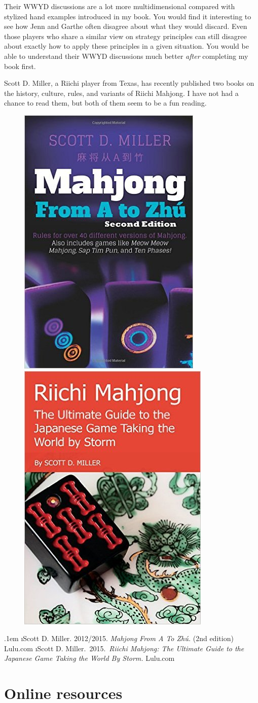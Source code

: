 \bigskip
Their WWYD discussions are a lot more multidimensional compared with stylized hand examples introduced in my book. You would find it interesting to see how Jenn and Garthe often disagree about what they would discard. Even those players who share a similar view on strategy principles can still disagree about exactly how to apply these principles in a given situation. 
You would be able to understand their WWYD discussions much better \emph{after} completing my book first. 

\bigskip
Scott D. Miller, a Riichi player from Texas, has recently published two books on the history, culture, rules, and variants of Riichi Mahjong. I have not had a chance to read them, but both of them seem to be a fun reading. 

\vspace{-2pt}
\begin{figure}[h]\centering
\includegraphics[height=.34\textwidth,clip]{figs/miller1}
\includegraphics[height=.34\textwidth,clip]{figs/miller2}
\end{figure}
\vspace{-15pt}
\be\itemsep.1em \setcounter{enumi}{5}
\i Scott D. Miller. 2012/2015. \textit{Mahjong From A To Zh\'{u}.} (2nd edition) Lulu.com
\i Scott D. Miller.~2015.~\textit{Riichi Mahjong: The Ultimate Guide to the Japanese Game Taking the World By Storm.} Lulu.com
\ee


\newpage
\section{Online resources}

